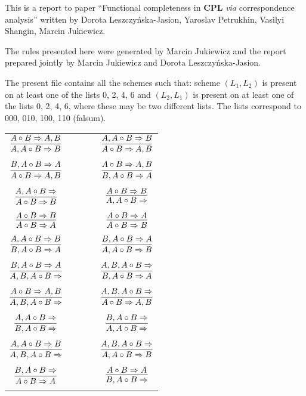 \documentclass[11pt]{article}
\begin{document}
	This is a report to paper ``Functional completeness in \textbf{CPL} \textit{via} correspondence analysis'' written by Dorota Leszczy\'{n}ska-Jasion, 
	Yaroslav Petrukhin, Vasilyi Shangin, Marcin Jukiewicz. 
	
	The rules presented here were generated by Marcin Jukiewicz and the report prepared jointly by Marcin Jukiewicz and Dorota Leszczy\'{n}ska-Jasion.
	
	The present file contains all the schemes such that: scheme $(L_1, L_2)$ is present on at least one of the lists 0, 2, 4, 6 and $(L_2, L_1)$ is present on at least one of the lists 0, 2, 4, 6, where these may be two different lists. The lists correspond to 000, 010, 100, 110 (falsum).

\bigskip

\begin{center}

\begin{tabular}{ccc}
$\infer{A, A\circ B\Rightarrow B}{A\circ B\Rightarrow A, B}$ & \ \ \ \ & $\infer{A\circ B\Rightarrow A, B}{A, A\circ B\Rightarrow B}$ \\
&& \\
$\infer{A\circ B\Rightarrow A, B}{B, A\circ B\Rightarrow A}$ && $\infer{B, A\circ B\Rightarrow A}{A\circ B\Rightarrow A, B}$ \\ 
&& \\
$\infer{A\circ B\Rightarrow B}{A, A\circ B\Rightarrow }$ && $\infer{A, A\circ B\Rightarrow }{A\circ B\Rightarrow B}$ \\
&& \\
$\infer{A\circ B\Rightarrow A}{A\circ B\Rightarrow B}$ && $\infer{A\circ B\Rightarrow B}{A\circ B\Rightarrow A}$ \\
&& \\
$\infer{B, A\circ B\Rightarrow A}{A, A\circ B\Rightarrow B}$ && $\infer{A, A\circ B\Rightarrow B}{B, A\circ B\Rightarrow A}$ \\
&& \\
$\infer{A, B, A\circ B\Rightarrow }{B, A\circ B\Rightarrow A}$ && $\infer{B, A\circ B\Rightarrow A}{A, B, A\circ B\Rightarrow }$ \\
&& \\
$\infer{A, B, A\circ B\Rightarrow }{A\circ B\Rightarrow A, B}$ && $\infer{A\circ B\Rightarrow A, B}{A, B, A\circ B\Rightarrow }$ \\
&& \\
$\infer{B, A\circ B\Rightarrow }{A, A\circ B\Rightarrow }$ && $\infer{A, A\circ B\Rightarrow }{B, A\circ B\Rightarrow }$ \\
&& \\
$\infer{A, B, A\circ B\Rightarrow }{A, A\circ B\Rightarrow B}$ && $\infer{A, A\circ B\Rightarrow B}{A, B, A\circ B\Rightarrow }$ \\
&& \\
$\infer{A\circ B\Rightarrow A}{B, A\circ B\Rightarrow }$ && $\infer{B, A\circ B\Rightarrow }{A\circ B\Rightarrow A}$ \\
&& \\

\end{tabular}

\end{center}
\end{document}

